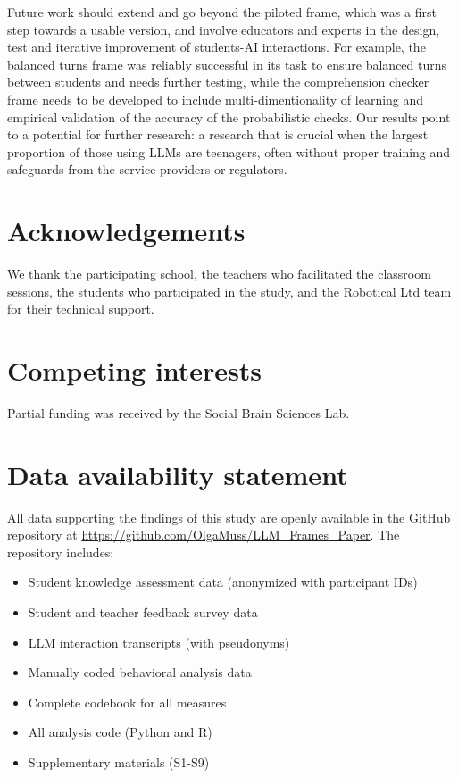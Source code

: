 \documentclass[fleqn,10pt]{wlscirep}
\begin{document}
Future work should extend and go beyond the piloted frame, which was a first step towards a usable version, and involve educators and experts in the design, test and iterative improvement of students-AI interactions. For example, the balanced turns frame was reliably successful in its task to ensure balanced turns between students and needs further testing, while the comprehension checker frame needs to be developed to include multi-dimentionality of learning and empirical validation of the accuracy of the probabilistic checks. Our results point to a potential for further research: a research that is crucial when the largest proportion of those using LLMs are teenagers, often without proper training and safeguards from the service providers or regulators.

\section*{Acknowledgements}

We thank the participating school, the teachers who facilitated the classroom sessions, the students who participated in the study, and the Robotical Ltd team for their technical support.

\section*{Competing interests}

Partial funding was received by the Social Brain Sciences Lab.

\section*{Data availability statement}

All data supporting the findings of this study are openly available in the GitHub repository at \href{https://github.com/OlgaMuss/LLM_Frames_Paper}{https://github.com/OlgaMuss/LLM\_Frames\_Paper}. The repository includes:

\begin{itemize}
\item Student knowledge assessment data (anonymized with participant IDs)
\item Student and teacher feedback survey data
\item LLM interaction transcripts (with pseudonyms)
\item Manually coded behavioral analysis data
\item Complete codebook for all measures
\item All analysis code (Python and R)
\item Supplementary materials (S1-S9)
\end{itemize}
\end{document}
